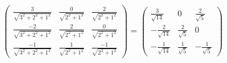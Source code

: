 		\begin{gather*}
			\begin{pmatrix}
				\frac{3}{\sqrt{3^2 + 2^2 + 1^2}} & \frac{0}{\sqrt{2^2 + 1^2}} & \frac{2}{\sqrt{2^2 + 1^2}}\\
				\frac{-2}{\sqrt{3^2 + 2^2 + 1^2}} & \frac{2}{\sqrt{2^2 + 1^2}} & \frac{0}{\sqrt{2^2 + 1^2}}\\
				\frac{-1}{\sqrt{3^2 + 2^2 + 1^2}} & \frac{1}{\sqrt{2^2 + 1^2}} & \frac{-1}{\sqrt{2^2 + 1^2}}
			\end{pmatrix}
			=
			\begin{pmatrix}
				\frac{3}{\sqrt{14}} & 0 & \frac{2}{\sqrt{5}}\\
				-\frac{2}{\sqrt{14}} & \frac{2}{\sqrt{5}} & 0\\
				-\frac{1}{\sqrt{14}} & \frac{1}{\sqrt{5}} & -\frac{1}{\sqrt{5}}
			\end{pmatrix}
		\end{gather*}
	
